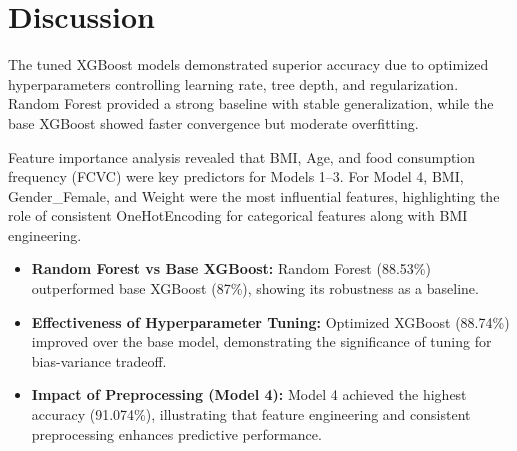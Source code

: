 \documentclass[12pt,a4paper]{report}
\begin{document}
\chapter{Discussion}
The tuned XGBoost models demonstrated superior accuracy due to optimized hyperparameters controlling learning rate, tree depth, and regularization. Random Forest provided a strong baseline with stable generalization, while the base XGBoost showed faster convergence but moderate overfitting.

Feature importance analysis revealed that BMI, Age, and food consumption frequency (FCVC) were key predictors for Models 1–3. For Model 4, BMI, Gender\_Female, and Weight were the most influential features, highlighting the role of consistent OneHotEncoding for categorical features along with BMI engineering.

\begin{itemize}
    \item \textbf{Random Forest vs Base XGBoost:} Random Forest (88.53\%) outperformed base XGBoost (87\%), showing its robustness as a baseline.
    \item \textbf{Effectiveness of Hyperparameter Tuning:} Optimized XGBoost (88.74\%) improved over the base model, demonstrating the significance of tuning for bias-variance tradeoff.
    \item \textbf{Impact of Preprocessing (Model 4):} Model 4 achieved the highest accuracy (91.074\%), illustrating that feature engineering and consistent preprocessing enhances predictive performance.
\end{itemize}

\end{document}
